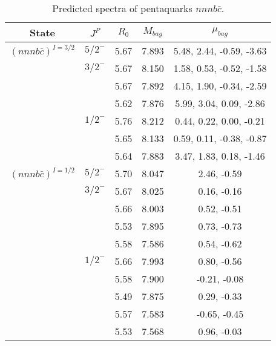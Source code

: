 \documentclass[prd,twocolumn,floatfix,nofootinbib]{revtex4}
\begin{document}
\renewcommand{\tabcolsep}{0.5cm}
\renewcommand{\arraystretch}{1.2}
\begin{table*}[!htbp]
    \caption{Predicted spectra of pentaquarks $nnnb\bar{c}$.}
    \begin{tabular}{ccccc}
        \hline\hline
        {\rm State} &$J^{P}$ &$R_{0}$ &$M_{bag}$&$\mu_{bag}$\\ \hline
        ${(nnnb\bar{c})}^{I=3/2}$
            &${5/2}^{-}$    &5.67   &7.893 &5.48, 2.44, -0.59, -3.63 \\
            &${3/2}^{-}$    &5.67   &8.150 &1.58, 0.53, -0.52, -1.58  \\
            &               &5.67   &7.892 &4.15, 1.90, -0.34, -2.59  \\
            &               &5.62   &7.876 &5.99, 3.04, 0.09, -2.86  \\
            &${1/2}^{-}$    &5.76   &8.212 &0.44, 0.22, 0.00, -0.21  \\
            &               &5.65   &8.133 &0.59, 0.11, -0.38, -0.87  \\
            &               &5.64   &7.883 &3.47, 1.83, 0.18, -1.46 \\
        ${(nnnb\bar{c})}^{I=1/2}$
            &${5/2}^{-}$    &5.70   &8.047 &2.46, -0.59  \\
            &${3/2}^{-}$    &5.67   &8.025 &0.16, -0.16  \\
            &               &5.66   &8.003 &0.52, -0.51  \\
            &               &5.53   &7.895 &0.73, -0.73 \\
            &               &5.58   &7.586 &0.54, -0.62  \\
            &${1/2}^{-}$    &5.66   &7.993 &0.80, -0.56  \\
            &               &5.58   &7.900 &-0.21, -0.08  \\
            &               &5.49   &7.875 &0.29, -0.33  \\
            &               &5.57   &7.583 &-0.65, -0.45  \\
            &               &5.53   &7.568 &0.96, -0.03  \\
        \hline\hline
    \end{tabular}
\end{table*}
\end{document}
